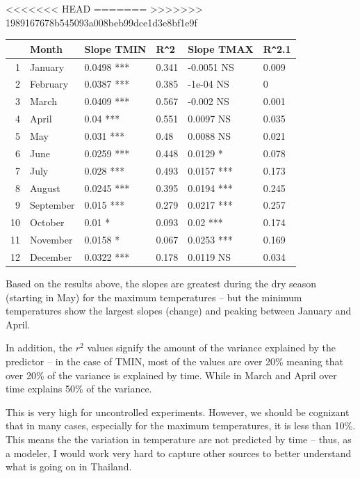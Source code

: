 \documentclass{article}\usepackage[]{graphicx}\usepackage[]{color}
\makeatletter
\newenvironment{kframe}{%
 \def\at@end@of@kframe{}%
 \ifinner\ifhmode%
  \def\at@end@of@kframe{\end{minipage}}%
  \begin{minipage}{\columnwidth}%
 \fi\fi%
 \def\FrameCommand##1{\hskip\@totalleftmargin \hskip-\fboxsep
 \colorbox{shadecolor}{##1}\hskip-\fboxsep
     \hskip-\linewidth \hskip-\@totalleftmargin \hskip\columnwidth}%
 \MakeFramed {\advance\hsize-\width
   \@totalleftmargin\z@ \linewidth\hsize
   \@setminipage}}%
 {\par\unskip\endMakeFramed%
 \at@end@of@kframe}
\makeatother
\begin{document}
\begin{enumerate}
\begin{kframe}
\begin{alltt}
\end{alltt}
\end{kframe}%
<<<<<<< HEAD
=======
>>>>>>> 1989167678b545093a008beb99dce1d3e8bf1e9f
\begin{table}[ht]
\centering
\begin{tabular}{rlllll}
  \hline
 & Month & Slope TMIN & R\verb|^|2 & Slope TMAX & R\verb|^|2.1 \\ 
  \hline
1 & January & 0.0498 *** & 0.341 & -0.0051 NS & 0.009 \\ 
  2 & February & 0.0387 *** & 0.385 & -1e-04 NS & 0 \\ 
  3 & March & 0.0409 *** & 0.567 & -0.002 NS & 0.001 \\ 
  4 & April & 0.04 *** & 0.551 & 0.0097 NS & 0.035 \\ 
  5 & May & 0.031 *** & 0.48 & 0.0088 NS & 0.021 \\ 
  6 & June & 0.0259 *** & 0.448 & 0.0129 * & 0.078 \\ 
  7 & July & 0.028 *** & 0.493 & 0.0157 *** & 0.173 \\ 
  8 & August & 0.0245 *** & 0.395 & 0.0194 *** & 0.245 \\ 
  9 & September & 0.015 *** & 0.279 & 0.0217 *** & 0.257 \\ 
  10 & October & 0.01 * & 0.093 & 0.02 *** & 0.174 \\ 
  11 & November & 0.0158 * & 0.067 & 0.0253 *** & 0.169 \\ 
  12 & December & 0.0322 *** & 0.178 & 0.0119 NS & 0.034 \\ 
   \hline
\end{tabular}
\end{table}


Based on the results above, the slopes are greatest during the dry season (starting in May) for the maximum temperatures -- but the minimum temperatures show the largest slopes (change) and peaking between January and April.  

In addition, the $r^2$ values signify the amount of the variance explained by the predictor -- in the case of TMIN, most of the values are over 20\% meaning that over 20\% of the variance is explained by time. While in March and April over time explains 50\% of the variance. 

This is very high for uncontrolled experiments. However, we should be cognizant that in many cases, especially for the maximum temperatures, it is less than 10\%. This means the the variation in temperature are not predicted by time -- thus, as a modeler, I would work very hard to capture other sources to better understand what is going on in Thailand. 


\end{enumerate}
\end{document}
